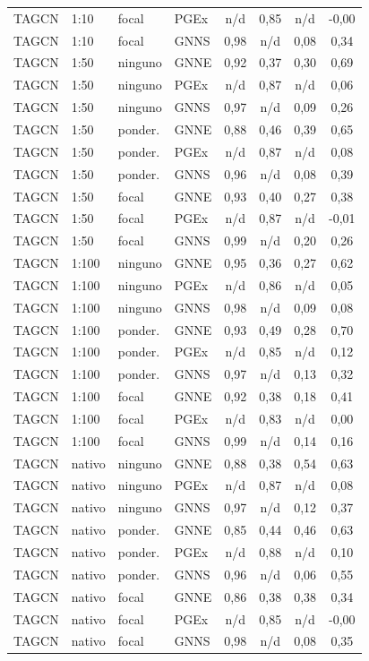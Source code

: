 \begin{longtable}{llll cccc}
TAGCN & 1:10 & focal & PGEx & n/d & 0,85 & n/d & -0,00 \\
TAGCN & 1:10 & focal & GNNS & 0,98 & n/d & 0,08 & 0,34 \\
TAGCN & 1:50 & ninguno & GNNE & 0,92 & 0,37 & 0,30 & 0,69 \\
TAGCN & 1:50 & ninguno & PGEx & n/d & 0,87 & n/d & 0,06 \\
TAGCN & 1:50 & ninguno & GNNS & 0,97 & n/d & 0,09 & 0,26 \\
TAGCN & 1:50 & ponder. & GNNE & 0,88 & 0,46 & 0,39 & 0,65 \\
TAGCN & 1:50 & ponder. & PGEx & n/d & 0,87 & n/d & 0,08 \\
TAGCN & 1:50 & ponder. & GNNS & 0,96 & n/d & 0,08 & 0,39 \\
TAGCN & 1:50 & focal & GNNE & 0,93 & 0,40 & 0,27 & 0,38 \\
TAGCN & 1:50 & focal & PGEx & n/d & 0,87 & n/d & -0,01 \\
TAGCN & 1:50 & focal & GNNS & 0,99 & n/d & 0,20 & 0,26 \\
TAGCN & 1:100 & ninguno & GNNE & 0,95 & 0,36 & 0,27 & 0,62 \\
TAGCN & 1:100 & ninguno & PGEx & n/d & 0,86 & n/d & 0,05 \\
TAGCN & 1:100 & ninguno & GNNS & 0,98 & n/d & 0,09 & 0,08 \\
TAGCN & 1:100 & ponder. & GNNE & 0,93 & 0,49 & 0,28 & 0,70 \\
TAGCN & 1:100 & ponder. & PGEx & n/d & 0,85 & n/d & 0,12 \\
TAGCN & 1:100 & ponder. & GNNS & 0,97 & n/d & 0,13 & 0,32 \\
TAGCN & 1:100 & focal & GNNE & 0,92 & 0,38 & 0,18 & 0,41 \\
TAGCN & 1:100 & focal & PGEx & n/d & 0,83 & n/d & 0,00 \\
TAGCN & 1:100 & focal & GNNS & 0,99 & n/d & 0,14 & 0,16 \\
TAGCN & nativo & ninguno & GNNE & 0,88 & 0,38 & 0,54 & 0,63 \\
TAGCN & nativo & ninguno & PGEx & n/d & 0,87 & n/d & 0,08 \\
TAGCN & nativo & ninguno & GNNS & 0,97 & n/d & 0,12 & 0,37 \\
TAGCN & nativo & ponder. & GNNE & 0,85 & 0,44 & 0,46 & 0,63 \\
TAGCN & nativo & ponder. & PGEx & n/d & 0,88 & n/d & 0,10 \\
TAGCN & nativo & ponder. & GNNS & 0,96 & n/d & 0,06 & 0,55 \\
TAGCN & nativo & focal & GNNE & 0,86 & 0,38 & 0,38 & 0,34 \\
TAGCN & nativo & focal & PGEx & n/d & 0,85 & n/d & -0,00 \\
TAGCN & nativo & focal & GNNS & 0,98 & n/d & 0,08 & 0,35 \\
\end{longtable}
